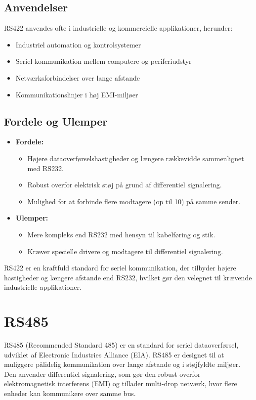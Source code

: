 \subsection{Anvendelser}
RS422 anvendes ofte i industrielle og kommercielle applikationer, herunder:
\begin{itemize}
	\item Industriel automation og kontrolsystemer
	\item Seriel kommunikation mellem computere og periferiudstyr
	\item Netværksforbindelser over lange afstande
	\item Kommunikationslinjer i høj EMI-miljøer
\end{itemize}

\subsection{Fordele og Ulemper}
\begin{itemize}
	\item \textbf{Fordele:}
	\begin{itemize}
		\item Højere dataoverførselshastigheder og længere rækkevidde sammenlignet med RS232.
		\item Robust overfor elektrisk støj på grund af differentiel signalering.
		\item Mulighed for at forbinde flere modtagere (op til 10) på samme sender.
	\end{itemize}
	\item \textbf{Ulemper:}
	\begin{itemize}
		\item Mere kompleks end RS232 med hensyn til kabelføring og stik.
		\item Kræver specielle drivere og modtagere til differentiel signalering.
	\end{itemize}
\end{itemize}
RS422 er en kraftfuld standard for seriel kommunikation, der tilbyder højere hastigheder og længere afstande end RS232, hvilket gør den velegnet til krævende industrielle applikationer.

\section{RS485}
RS485 (Recommended Standard 485) er en standard for seriel dataoverførsel, udviklet af Electronic Industries Alliance (EIA). RS485 er designet til at muliggøre pålidelig kommunikation over lange afstande og i støjfyldte miljøer. Den anvender differentiel signalering, som gør den robust overfor elektromagnetisk interferens (EMI) og tillader multi-drop netværk, hvor flere enheder kan kommunikere over samme bus.

